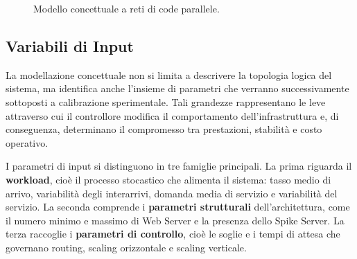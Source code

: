 ﻿\documentclass[a4paper,12pt]{article}
\begin{document}
\begin{figure}[htbp]
    \caption{Modello concettuale a reti di code parallele.}
    \label{fig:conceptual_queueing_model}
\end{figure}


\subsection{Variabili di Input}
La modellazione concettuale non si limita a descrivere la topologia logica del sistema, ma identifica anche l'insieme di parametri che verranno successivamente sottoposti a calibrazione sperimentale. Tali grandezze rappresentano le leve attraverso cui il controllore modifica il comportamento dell'infrastruttura e, di conseguenza, determinano il compromesso tra prestazioni, stabilità e costo operativo.

I parametri di input si distinguono in tre famiglie principali. La prima riguarda il \textbf{workload}, cioè il processo stocastico che alimenta il sistema: tasso medio di arrivo, variabilità degli interarrivi, domanda media di servizio e variabilità del servizio. La seconda comprende i \textbf{parametri strutturali} dell'architettura, come il numero minimo e massimo di Web Server e la presenza dello Spike Server. La terza raccoglie i \textbf{parametri di controllo}, cioè le soglie e i tempi di attesa che governano routing, scaling orizzontale e scaling verticale.
\end{document}
